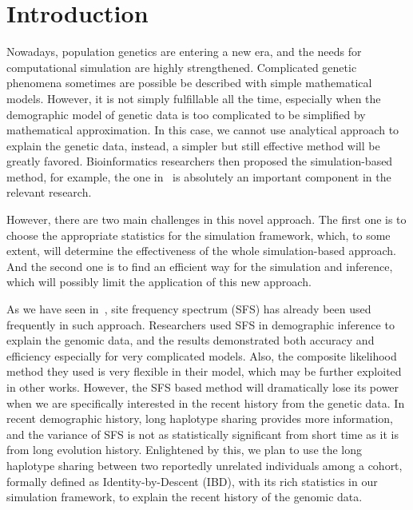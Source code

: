 \documentclass{bioinfo}
\begin{document}
\section{Introduction}

Nowadays, population genetics are entering a new era, and the needs for computational simulation are highly strengthened. Complicated genetic phenomena sometimes are possible be described with simple mathematical models. However, it is not simply fulfillable all the time, especially when the demographic model of genetic data is too complicated to be simplified by mathematical approximation. In this case, we cannot use analytical approach to explain the genetic data, instead, a simpler but still effective method will be greatly favored. Bioinformatics researchers then proposed the simulation-based method, for example, the one in~\cite{Excoffier2013} is absolutely an important component in the relevant research.

However, there are two main challenges in this novel approach. The first one is to choose the appropriate statistics for the simulation framework, which, to some extent, will determine the effectiveness of the whole simulation-based approach. And the second one is to find an efficient way for the simulation and inference, which will possibly limit the application of this new approach.

As we have seen in~\cite{Excoffier2013}, site frequency spectrum (SFS) has already been used frequently in such approach. Researchers used SFS in demographic inference to explain the genomic data, and the results demonstrated both accuracy and efficiency especially for very complicated models. Also, the composite likelihood method they used is very flexible in their model, which may be further exploited in other works. However, the SFS based method will dramatically lose its power when we are specifically interested in the recent history from the genetic data. In recent demographic history, long haplotype sharing provides more information, and the variance of SFS is not as statistically significant from short time as it is from long evolution history. Enlightened by this, we plan to use the long haplotype sharing between two reportedly unrelated individuals among a cohort, formally defined as Identity-by-Descent (IBD), with its rich statistics in our simulation framework, to explain the recent history of the genomic data.
\end{document}
